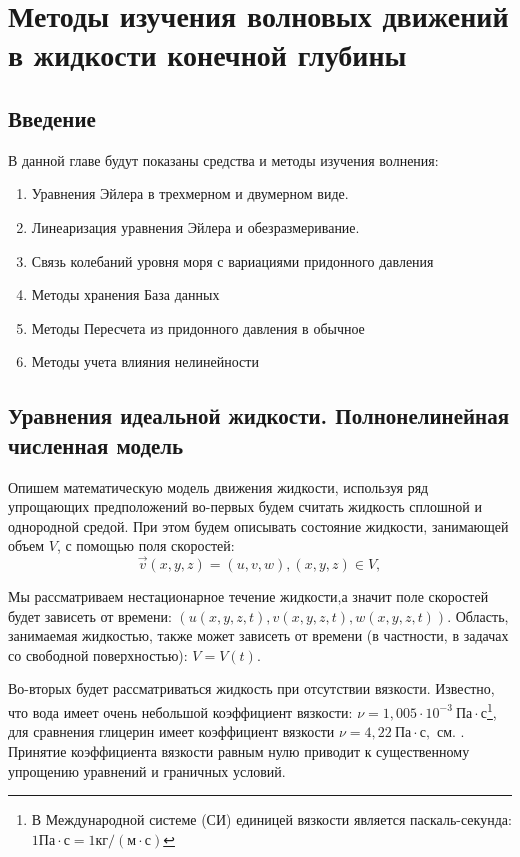 \chapter{Методы изучения волновых движений в жидкости конечной глубины} \label{chapt1}

\section{Введение}

В данной главе будут показаны средства и методы изучения волнения:
\begin{enumerate}
  \item Уравнения Эйлера в трехмерном и двумерном виде.
  \item Линеаризация уравнения Эйлера и обезразмеривание.
  \item Связь колебаний уровня моря с вариациями придонного давления
  \item Методы хранения База данных
  \item Методы Пересчета из придонного давления в обычное
  \item Методы учета влияния нелинейности
\end{enumerate}
\section{Уравнения идеальной жидкости. Полнонелинейная численная модель}


Опишем математическую модель движения жидкости, используя ряд упрощающих предположений во-первых будем считать жидкость сплошной и однородной средой. При этом будем описывать состояние жидкости, занимающей объем $V$, с помощью поля скоростей:
$$
\overrightarrow v(x,y,z)=(u,v,w), (x,y,z)\in V,
$$

Мы рассматриваем нестационарное течение жидкости,а значит поле скоростей будет зависеть от
вре\-ме\-ни: $(u(x,y,z,t),v(x,y,z,t),w(x,y,z,t))$. Область, занимаемая жидкостью, также может зависеть от времени (в частности, в задачах со свободной поверхностью): $V=V(t)$.

Во-вторых будет рассматриваться жидкость при отсутствии вязкости. Известно, что  вода имеет очень небольшой коэффициент вязкости:
$\nu=1,005\cdot 10^{-3}\ \mbox{Па}\cdot\mbox{с}$\footnote{В Международной системе (СИ) единицей вязкости является паскаль-секунда:
$1\mbox{Па}\cdot\mbox{с}=1\mbox{кг}/(\mbox{м}\cdot\mbox{с})$}, для сравнения глицерин имеет коэффициент вязкости $\nu=4,22\ \mbox{Па}\cdot\mbox{с},$ см. \cite{loyts}. Принятие коэффициента вязкости равным нулю приводит к существенному упрощению уравнений и граничных условий.

